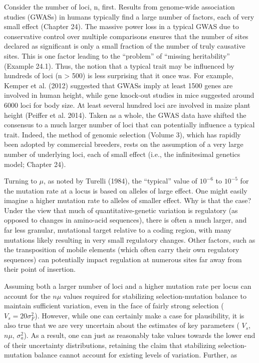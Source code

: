 \documentclass{article}
\begin{document}
Consider the number of loci, n, first. Results from genome-wide association studies (GWASs) in humans typically find a large number of factors, each of very small effect (Chapter 24). The massive power loss in a typical GWAS due to conservative control over multiple comparisons ensures that the number of sites declared as significant is only a small fraction of the number of truly causative sites. This is one factor leading to the “problem” of “missing heritability” (Example 24.1). Thus, the notion that a typical trait may be influenced by hundreds of loci (n > 500) is less surprising that it once was. For example, Kemper et al. (2012) suggested that GWASs imply at least 1500 genes are involved in human height, while gene knock-out studies in mice suggested around 6000 loci for body size. At least several hundred loci are involved in maize plant height (Peiffer et al. 2014). Taken as a whole, the GWAS data have shifted the consensus to a much larger number of loci that can potentially influence a typical trait. Indeed, the method of genomic selection (Volume 3), which has rapidly been adopted by commercial breeders, rests on the assumption of a very large number of underlying loci, each of small effect (i.e., the infinitesimal genetics model; Chapter 24).

Turning to  $ \mu $, as noted by Turelli (1984), the “typical” value of  $ 10^{-6} $ to  $ 10^{-5} $ for the mutation rate at a locus is based on alleles of large effect. One might easily imagine a higher mutation rate to alleles of smaller effect. Why is that the case? Under the view that much of quantitative-genetic variation is regulatory (as opposed to changes in amino-acid sequences), there is often a much larger, and far less granular, mutational target relative to a coding region, with many mutations likely resulting in very small regulatory changes. Other factors, such as the transposition of mobile elements (which often carry their own regulatory sequences) can potentially impact regulation at numerous sites far away from their point of insertion.

Assuming both a larger number of loci and a higher mutation rate per locus can account for the  $ n\mu $ values required for stabilizing selection-mutation balance to maintain sufficient variation, even in the face of fairly strong selection ( $ V_s = 20\sigma_F^2 $). However, while one can certainly make a case for plausibility, it is also true that we are very uncertain about the estimates of key parameters ( $ V_s $,  $ n\mu $,  $ \sigma_a^2 $). As a result, one can just as reasonably take values towards the lower end of their uncertainty distributions, retaining the claim that stabilizing selection-mutation balance cannot account for existing levels of variation. Further, as
\end{document}
